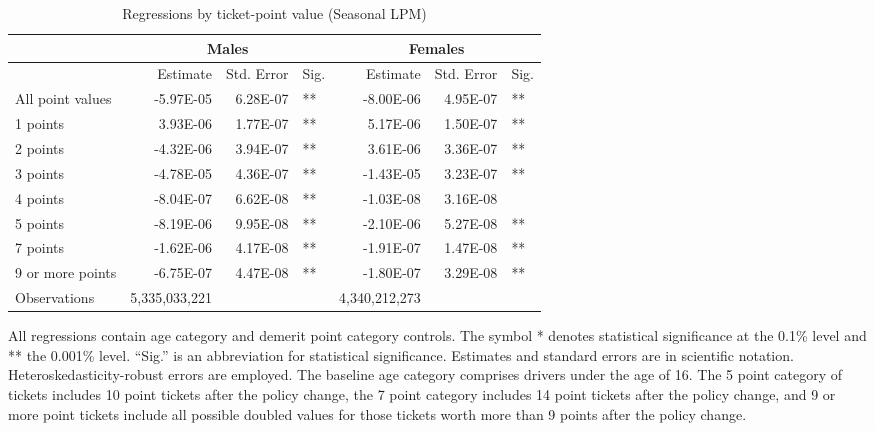 
\begin{table}%
\centering 
\begin{tabular}{l r r l r r l} 

\hline 
 
 & \multicolumn{3}{c}{Males} & \multicolumn{3}{c}{Females} \\ 

\hline 
 
 & Estimate & Std. Error & Sig. & Estimate & Std. Error & Sig. \\ 

\hline 
 
All point values                &  -5.97E-05        &  6.28E-07       &   **       &  -8.00E-06        &  4.95E-07       &   **       \\ 
1 points                        &  3.93E-06        &  1.77E-07       &   **       &  5.17E-06        &  1.50E-07       &   **       \\ 
2 points                        &  -4.32E-06        &  3.94E-07       &   **       &  3.61E-06        &  3.36E-07       &   **       \\ 
3 points                        &  -4.78E-05        &  4.36E-07       &   **       &  -1.43E-05        &  3.23E-07       &   **       \\ 
4 points                        &  -8.04E-07        &  6.62E-08       &   **       &  -1.03E-08        &  3.16E-08       &            \\ 
5 points                        &  -8.19E-06        &  9.95E-08       &   **       &  -2.10E-06        &  5.27E-08       &   **       \\ 
7 points                        &  -1.62E-06        &  4.17E-08       &   **       &  -1.91E-07        &  1.47E-08       &   **       \\ 
9 or more points                &  -6.75E-07        &  4.47E-08       &   **       &  -1.80E-07        &  3.29E-08       &   **       \\ 
Observations            & 5,335,033,221    &          &              &  4,340,212,273 \\ 


\hline 

\end{tabular} 
\caption{Regressions by ticket-point value (Seasonal LPM)} 
All regressions contain age category and demerit point category controls. 
The symbol * denotes statistical significance at the 0.1\% level 
and ** the 0.001\% level. 
``Sig.'' is an abbreviation for statistical significance. 
Estimates and standard errors are in scientific notation. 
Heteroskedasticity-robust errors are employed. 
The baseline age category comprises drivers under the age of 16. 
The 5 point category of tickets includes 10 point tickets after the policy change,  
the 7 point category includes 14 point tickets after the policy change,  
and 9 or more point tickets include all possible doubled values for those tickets  
worth more than 9 points after the policy change. 
\label{tab:seas_regs_by_points} 
\end{table} 
 
